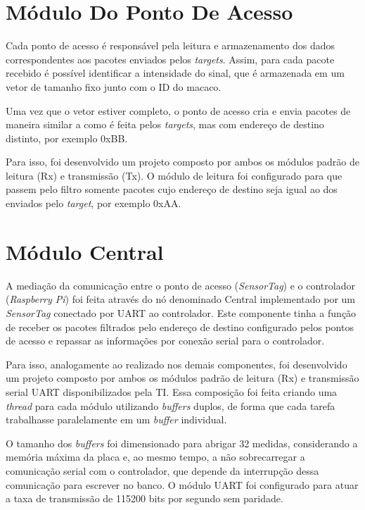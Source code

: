 \section{Módulo Do Ponto De Acesso}

Cada ponto de acesso é responsável pela leitura e armazenamento dos dados correspondentes aos pacotes enviados pelos \emph{targets}. Assim, para cada pacote recebido é possível identificar a intensidade do sinal, que é armazenada em um vetor de tamanho fixo junto com o ID do macaco.

Uma vez que o vetor estiver completo, o ponto de acesso cria e envia pacotes de maneira similar a como é feita pelos \emph{targets}, mas com endereço de destino distinto, por exemplo 0xBB.

Para isso, foi desenvolvido um projeto composto por ambos os módulos padrão de leitura (Rx) e transmissão (Tx). O módulo de leitura foi configurado para que passem pelo filtro somente pacotes cujo endereço de destino seja igual ao dos enviados pelo \emph{target}, por exemplo 0xAA.

\section{Módulo Central}

A mediação da comunicação entre o ponto de acesso (\emph{SensorTag}) e o controlador (\emph{Raspberry Pi}) foi feita através do nó denominado Central implementado por um \emph{SensorTag} conectado por UART ao controlador.
Este componente tinha a função de receber os pacotes filtrados pelo endereço de destino configurado pelos pontos de acesso e repassar as informações por conexão serial para o controlador.

Para isso, analogamente ao realizado nos demais componentes, foi desenvolvido um projeto composto por ambos os módulos padrão de leitura (Rx) e transmissão serial UART disponibilizados pela TI. Essa composição foi feita criando uma \emph{thread} para cada módulo utilizando \emph{buffers} duplos, de forma que cada tarefa trabalhasse paralelamente em um \emph{buffer} individual.

O tamanho dos \emph{buffers} foi dimensionado para abrigar 32 medidas, considerando a memória máxima da placa e, ao mesmo tempo, a não sobrecarregar a comunicação serial com o controlador, que depende da interrupção dessa comunicação para escrever no banco. O módulo UART foi configurado para atuar a taxa de transmissão de 115200 bits por segundo sem paridade.

